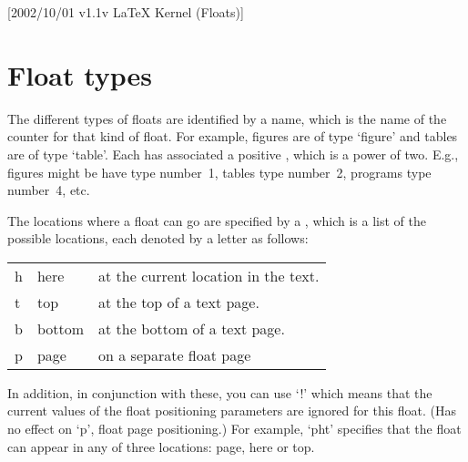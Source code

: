 
[2002/10/01 v1.1v LaTeX Kernel (Floats)]

 \section{Float types}

  The different types of floats are identified by a  name,
  which is the name of the counter for that kind of float.  For
  example, figures are of type `figure' and tables are of type `table'.
  Each  has associated a positive , which
  is a power of two.  E.g.,\\
  figures might be have type number~1, tables type number~2, programs
  type number~4, etc.

  The locations where a float can go are specified by a
  , which is a list of the possible
  locations, each denoted by a letter as follows:
    \begin{center}
    \begin{tabular}{l@{ : }l@{ --- }l}
     h & here   & at the current location in the text.\\
     t & top    & at the top of a text page.\\
     b & bottom & at the bottom of a text page.\\
     p & page   & on a separate float page
    \end{tabular}
    \end{center}
  In addition, in conjunction with these, you can use `!' which means
  that the current values of the float positioning parameters are
  ignored for this float. (Has no effect on `p', float page
  positioning.)
  For example, `pht' specifies that the float can appear in any of
  three locations: page, here or top.

